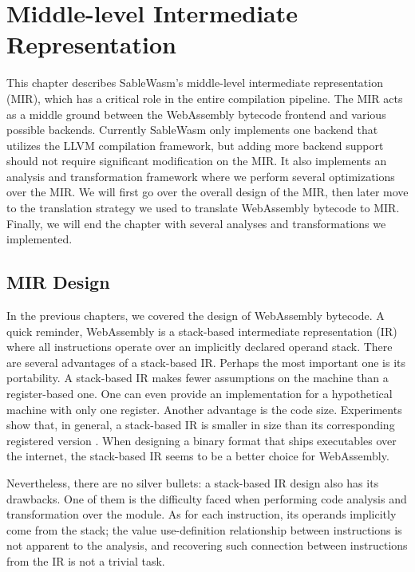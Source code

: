\chapter{Middle-level Intermediate Representation}

This chapter describes SableWasm's middle-level intermediate representation
(MIR), which has a critical role in the entire compilation pipeline. The MIR
acts as a middle ground between the WebAssembly bytecode frontend and various
possible backends. Currently SableWasm only implements one backend that utilizes
the LLVM compilation framework, but adding more backend support should not
require significant modification on the MIR. It also implements an analysis and
transformation framework where we perform several optimizations over the MIR. We
will first go over the overall design of the MIR, then later move to the
translation strategy we used to translate WebAssembly bytecode to MIR. Finally,
we will end the chapter with several analyses and transformations we
implemented.

\section{MIR Design}

In the previous chapters, we covered the design of WebAssembly bytecode. A quick
reminder, WebAssembly is a stack-based intermediate representation (IR) where
all instructions operate over an implicitly declared operand stack. There are
several advantages of a stack-based IR. Perhaps the most important one is its
portability. A stack-based IR makes fewer assumptions on the machine than a
register-based one. One can even provide an implementation for a hypothetical
machine with only one register. Another advantage is the code size. Experiments
show that, in general, a stack-based IR is smaller in size than its
corresponding registered version \cite{stack-and-register-vm}. When designing a
binary format that ships executables over the internet, the stack-based IR seems
to be a better choice for WebAssembly.

Nevertheless, there are no silver bullets: a stack-based IR design also has its
drawbacks. One of them is the difficulty faced when performing code analysis and
transformation over the module. As for each instruction, its operands implicitly
come from the stack; the value use-definition relationship between instructions
is not apparent to the analysis, and recovering such connection between
instructions from the IR is not a trivial task.

